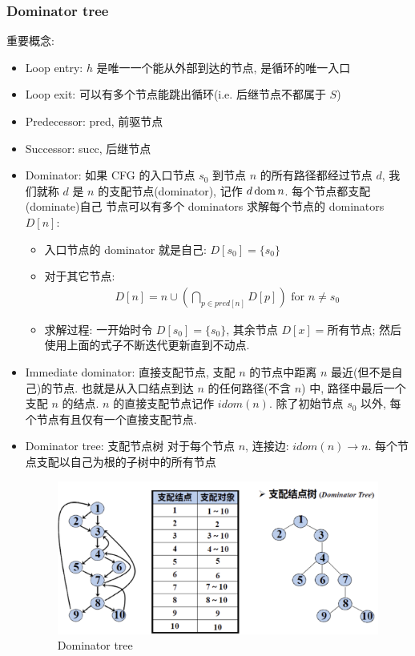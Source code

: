\subsubsection{Dominator tree}
重要概念:
\begin{itemize}
    \item Loop entry: $h$ 是唯一一个能从外部到达的节点, 是循环的唯一入口
    \item Loop exit: 可以有多个节点能跳出循环(i.e. 后继节点不都属于 $S$)
    \item Predecessor: pred, 前驱节点
    \item Successor: succ, 后继节点
    \item Dominator: 如果 CFG 的入口节点 $s_0$ 到节点 $n$ 的所有路径都经过节点 $d$, 我们就称 $d$ 是 $n$ 的支配节点(dominator), 记作 $d \operatorname*{dom} n$. 
    \subitem 每个节点都支配(dominate)自己
    \subitem 节点可以有多个 dominators
    \subitem 求解每个节点的 dominators $D[n]$:
    \begin{itemize}
        \item 入口节点的 dominator 就是自己: $D[s_0]=\{ s_0 \}$
        \item 对于其它节点: 
        \begin{align*}
            D[n]=n\cup \left( \bigcap_{p\in pred[n]} D[p] \right) \text{ for }n\ne s_0
        \end{align*}
        \item 求解过程: 一开始时令 $D[s_0]=\{ s_0 \}$, 其余节点 $D[x]=$所有节点; 然后使用上面的式子不断迭代更新直到不动点. 
    \end{itemize}
    \item Immediate dominator: 直接支配节点, 支配 $n$ 的节点中距离 $n$ 最近(但不是自己)的节点. 
    \subitem 也就是从入口结点到达 $n$ 的任何路径(不含 $n$) 中, 路径中最后一个支配 $n$ 的结点. 
    \subitem $n$ 的直接支配节点记作 $idom(n)$.
    \subitem 除了初始节点 $s_0$ 以外, 每个节点有且仅有一个直接支配节点. 
    \item Dominator tree: 支配节点树
    \subitem 对于每个节点 $n$, 连接边: $idom(n)\to n$.
    \subitem 每个节点支配以自己为根的子树中的所有节点
    \begin{figure}[H]
        \centering
        \includegraphics[width=0.84\linewidth]{pic/CP18/Dominator tree}
        \caption{Dominator tree}
    \end{figure}
\end{itemize}

